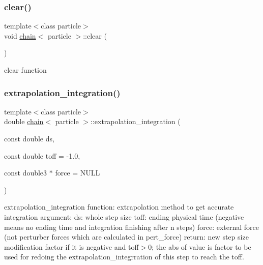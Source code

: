 \hypertarget{classchain_a63d5a11da8c3f0e0024fea9e8f2774bb}{}\label{classchain_a63d5a11da8c3f0e0024fea9e8f2774bb} 
\subsubsection{\texorpdfstring{clear()}{clear()}}
{\footnotesize\ttfamily template$<$class particle$>$ \\
void \hyperlink{classchain}{chain}$<$ particle $>$\+::clear (\begin{DoxyParamCaption}{ }\end{DoxyParamCaption})\hspace{0.3cm}{\ttfamily [inline]}}



clear function 

\hypertarget{classchain_ae6fe95b3bebd4ce9e0cc39086cec88f1}{}\label{classchain_ae6fe95b3bebd4ce9e0cc39086cec88f1} 
\subsubsection{\texorpdfstring{extrapolation\+\_\+integration()}{extrapolation\_integration()}}
{\footnotesize\ttfamily template$<$class particle$>$ \\
double \hyperlink{classchain}{chain}$<$ particle $>$\+::extrapolation\+\_\+integration (\begin{DoxyParamCaption}\item[{const double}]{ds,  }\item[{const double}]{toff = {\ttfamily -\/1.0},  }\item[{const double3 $\ast$}]{force = {\ttfamily NULL} }\end{DoxyParamCaption})\hspace{0.3cm}{\ttfamily [inline]}}



extrapolation\+\_\+integration function\+: extrapolation method to get accurate integration argument\+: ds\+: whole step size toff\+: ending physical time (negative means no ending time and integration finishing after n steps) force\+: external force (not perturber forces which are calculated in pert\+\_\+force) return\+: new step size modification factor if it is negative and toff$>$0; the abs of value is factor to be used for redoing the extrapolation\+\_\+integrration of this step to reach the toff. 

